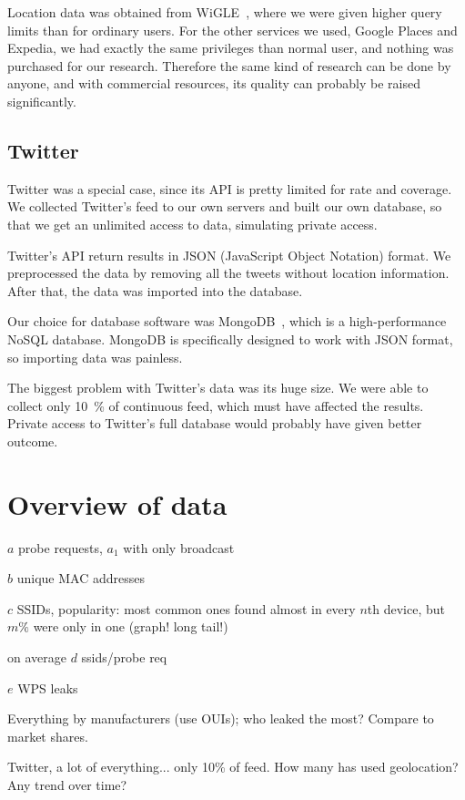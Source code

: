 \documentclass[12pt,a4paper,oneside,pdftex]{report}
\begin{document}
Location data was obtained from WiGLE~\cite{wigle}, where we were given higher query limits than for ordinary users. For the other services we used, Google Places and Expedia, we had exactly the same privileges than normal user, and nothing was purchased for our research. Therefore the same kind of research can be done by anyone, and with commercial resources, its quality can probably be raised significantly.

\subsection{Twitter}

Twitter was a special case, since its API is pretty limited for rate and coverage. We collected Twitter's feed to our own servers and built our own database, so that we get an unlimited access to data, simulating private access. 

Twitter's API return results in JSON (JavaScript Object Notation) format. We preprocessed the data by removing all the tweets without location information. After that, the data was imported into the database.

Our choice for database software was MongoDB~\cite{mongodb}, which is a high-performance NoSQL database. MongoDB is specifically designed to work with JSON format, so importing data was painless. 

The biggest problem with Twitter's data was its huge size. We were able to collect only 10~\% of continuous feed, which must have affected the results. Private access to Twitter's full database would probably have given better outcome.

\section{Overview of data}
\label{sec:data_overview}

$a$ probe requests, $a_1$ with only broadcast

$b$ unique MAC addresses

$c$ SSIDs, popularity: most common ones found almost in every $n$th device, but $m \%$ were only in one (graph! long tail!)

on average $d$ ssids/probe req

$e$ WPS leaks

Everything by manufacturers (use OUIs); who leaked the most? Compare to market shares.

Twitter, a lot of everything... only 10\% of feed. How many has used geolocation? Any trend over time?
\end{document}
